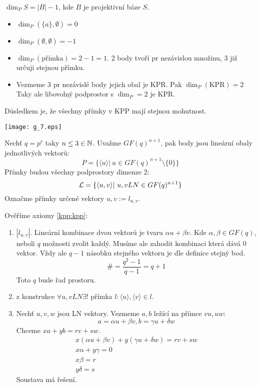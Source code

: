 \begin{definition}[Dimenze]
    $\dim_P S=|B|-1$, kde $B$ je projektivní báze $S$.
\end{definition}
\begin{note}[O dimenzi]
    \begin{itemize}
        \item $\dim_P(\{a\},\emptyset)=0$
        \item $\dim_P(\emptyset, \emptyset)=-1$
        \item $\dim_P(\text{přímka})=2-1=1$.
		2 body tvoří pr nezávislou množinu, 3 již určuji stejnou přímku.
        \item Vezmeme 3 pr nezávislé body jejich obal je KPR. Pak $\dim_P(\text{KPR})=2$
		Taky ale libovolný podprostor s $\dim_P = 2$ je KPR.
    \end{itemize}

    Důsledkem je, že všechny přímky v KPP mají stejnou mohutnost.

    \texttt{[image: g\_7.eps]}
\end{note}

\begin{example}
	Nechť $q = p^r$ taky $n \leq 3 \in \operatorname{\mathbb{N}}$.
	Uvažme $GF(q)^{n + 1}$, pak body jsou lineární obaly jednotlivých vektorů:
	\[ P = \{ \langle u \rangle |\ u \in GF(q)^{n + 1} \setminus \{ 0 \} \} \]
	Přímky budou všechny podprostory dimenze 2:
	\[ \operatorname{\mathcal{L}} = \{ \langle u, v \rangle |\ u,v LN \in GF(q)^{n + 1} \} \]
	Označme přímky určené vektory $u, v := l_{u, v}$.

	Ověříme axiomy \cref{kpp:kpp}:
	\begin{enumerate}
		\item $|l_{u, v}|$.
			Lineární kombinace dvou vektorů je tvaru $\alpha u + \beta v$.
			Kde $\alpha, \beta \in GF(q)$, neboli $q$ možnosti zvolit každý.
			Musíme ale zahodit kombinaci která dává 0 vektor.
			Vždy ale $q - 1$ násobku stejného vektoru je dle definice stejný bod.
			\[ \# = \frac{q^2 - 1}{q - 1} = q + 1 \]
			Toto $q$ bude řad prostoru.
		\item z konstrukce $\forall u, v LN \exists!$ přímka $l: \langle u \rangle, \langle v \rangle \in l$.
		\item Nechť $u, v, w$ jsou LN vektory.
			Vezmeme $a, b$ ležící na přímce $vu, uw$:
			\[ a = \alpha u + \beta v, b = \gamma u + \delta w \]
			Chceme $xa + yb = rv + sw$.
			\begin{gather*}
				x(\alpha u + \beta v) + y(\gamma u + \delta w) = rv + sw \\
				x \alpha + y \gamma = 0 \\
				x \beta = r \\
				y \delta = s
			\end{gather*}
			Soustava má řešení.
	\end{enumerate}
\end{example}

